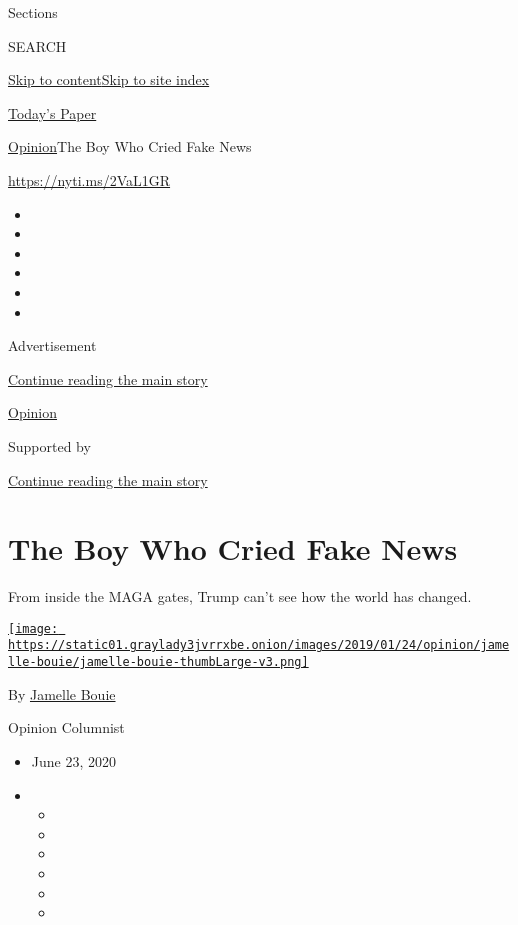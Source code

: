 Sections

SEARCH

\protect\hyperlink{site-content}{Skip to
content}\protect\hyperlink{site-index}{Skip to site index}

\href{https://myaccount.nytimes3xbfgragh.onion/auth/login?response_type=cookie\&client_id=vi}{}

\href{https://www.nytimes3xbfgragh.onion/section/todayspaper}{Today's
Paper}

\href{/section/opinion}{Opinion}\textbar{}The Boy Who Cried Fake News

\url{https://nyti.ms/2VaL1GR}

\begin{itemize}
\item
\item
\item
\item
\item
\item
\end{itemize}

Advertisement

\protect\hyperlink{after-top}{Continue reading the main story}

\href{/section/opinion}{Opinion}

Supported by

\protect\hyperlink{after-sponsor}{Continue reading the main story}

\hypertarget{the-boy-who-cried-fake-news}{%
\section{The Boy Who Cried Fake
News}\label{the-boy-who-cried-fake-news}}

From inside the MAGA gates, Trump can't see how the world has changed.

\href{https://www.nytimes3xbfgragh.onion/column/jamelle-bouie}{\texttt{[image: https://static01.graylady3jvrrxbe.onion/images/2019/01/24/opinion/jamelle-bouie/jamelle-bouie-thumbLarge-v3.png]}}

By
\href{https://www.nytimes3xbfgragh.onion/column/jamelle-bouie}{Jamelle
Bouie}

Opinion Columnist

\begin{itemize}
\item
  June 23, 2020
\item
  \begin{itemize}
  \item
  \item
  \item
  \item
  \item
  \item
  \end{itemize}
\end{itemize}

